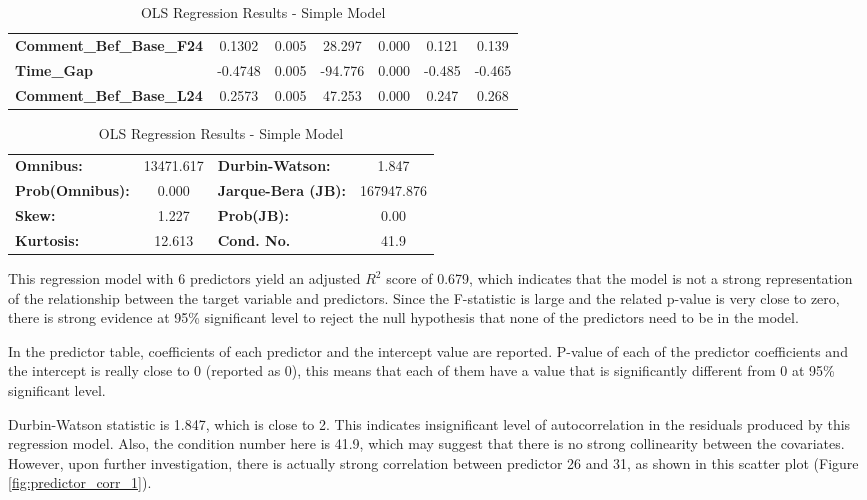 \documentclass[]{article}
\begin{document}
\begin{table}
\begin{center}
\begin{tabular}{lcccccc}
		\textbf{Comment\_Bef\_Base\_F24} &       0.1302  &        0.005     &    28.297  &         0.000        &        0.121    &        0.139     \\
		\textbf{Time\_Gap}               &      -0.4748  &        0.005     &   -94.776  &         0.000        &       -0.485    &       -0.465     \\
		\textbf{Comment\_Bef\_Base\_L24} &       0.2573  &        0.005     &    47.253  &         0.000        &        0.247    &        0.268     \\
		\bottomrule
	\end{tabular}
	\begin{tabular}{lclc}
		\textbf{Omnibus:}       & 13471.617 & \textbf{  Durbin-Watson:     } &     1.847   \\
		\textbf{Prob(Omnibus):} &    0.000  & \textbf{  Jarque-Bera (JB):  } & 167947.876  \\
		\textbf{Skew:}          &    1.227  & \textbf{  Prob(JB):          } &      0.00   \\
		\textbf{Kurtosis:}      &   12.613  & \textbf{  Cond. No.          } &      41.9   \\
		\bottomrule
	\end{tabular}
\end{center}
\caption{OLS Regression Results - Simple Model}
\label{tab:simple_summary}
\end{table}

This regression model with 6 predictors yield an adjusted $R^2$ score of 0.679, which indicates that the model is not a strong representation of the relationship between the target variable and predictors. Since the F-statistic is large and the related p-value is very close to zero, there is strong evidence at 95\% significant level to reject the null hypothesis that none of the predictors need to be in the model. 

In the predictor table, coefficients of each predictor and the intercept value are reported. P-value of each of the predictor coefficients and the intercept is really close to 0 (reported as 0), this means that each of them have a value that is significantly different from 0 at 95\% significant level. 

Durbin-Watson statistic is 1.847, which is close to 2. This indicates insignificant level of autocorrelation in the residuals produced by this regression model. Also, the condition number here is 41.9, which may suggest that there is no strong collinearity between the covariates. However, upon further investigation, there is actually strong correlation between predictor 26 and 31, as shown in this scatter plot (Figure \ref{fig:predictor_corr_1}).  
\end{document}
